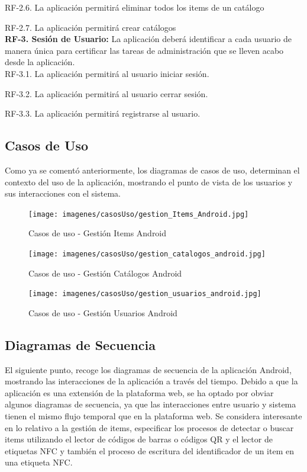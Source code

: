 \documentclass[a4paper,11pt]{book}
\begin{document}
	RF-2.6. La aplicación permitirá eliminar todos los items de un catálogo
	
	RF-2.7. La aplicación permitirá crear catálogos\\
	
	
\textbf{RF-3. Sesión de Usuario:} La aplicación deberá identificar a cada usuario de manera única para certificar las tareas de administración que se lleven acabo desde la aplicación.\\ 


	RF-3.1. La aplicación permitirá al usuario iniciar sesión.
	
	RF-3.2. La aplicación permitirá al usuario cerrar sesión.
	
	RF-3.3. La aplicación permitirá registrarse al usuario.\\



\subsection{Casos de Uso}
Como ya se comentó anteriormente, los diagramas de casos de uso, determinan el contexto del uso de la aplicación, mostrando el punto de vista de los usuarios  y sus interacciones con el sistema.

\begin{figure}[H]  
\centering 
\texttt{[image: imagenes/casosUso/gestion\_Items\_Android.jpg]}
\caption{ Casos de uso - Gestión Items Android\cite{diagrama} }  
\end{figure}

\begin{figure}[H]  
\centering 
\texttt{[image: imagenes/casosUso/gestion\_catalogos\_android.jpg]}
\caption{ Casos de uso - Gestión Catálogos Android\cite{diagrama}  }  
\end{figure}

\begin{figure}[H]  
\centering 
\texttt{[image: imagenes/casosUso/gestion\_usuarios\_android.jpg]}
\caption{ Casos de uso - Gestión Usuarios Android\cite{diagrama}  }  
\end{figure}


\subsection{Diagramas de Secuencia}
El siguiente punto, recoge los diagramas de secuencia de la aplicación Android,  mostrando las interacciones de la aplicación a través del tiempo. Debido a que la aplicación es una extensión de la plataforma web, se ha optado por obviar algunos diagramas de secuencia, ya que las interacciones entre usuario y sistema tienen el mismo flujo temporal que en la plataforma web. Se considera interesante en lo relativo a la gestión de items, especificar los procesos de detectar o buscar items utilizando el lector de códigos de barras o códigos QR y el lector de etiquetas NFC y también el proceso de escritura del identificador de un item en una etiqueta NFC. 
\end{document}
